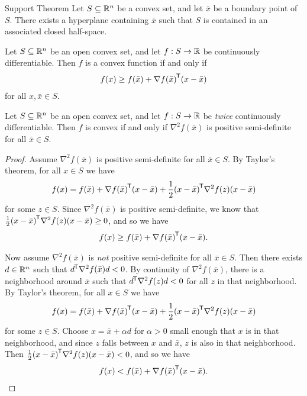 \begin{thm}{Support Theorem}\label{support-theorem}\proofbreak
    Let $S \subseteq \mathbb{R}^n$ be a convex set, and let $\bar{x}$ be a boundary point of $S$. There exists a hyperplane containing $\bar{x}$ such that $S$ is contained in an associated closed half-space.
\end{thm}

\begin{thm}\label{convex-function-tangent-hyperplane}
    Let $S \subseteq \mathbb{R}^n$ be an open convex set, and let $f: S \to \mathbb{R}$ be continuously differentiable. Then $f$ is a convex function if and only if
    \begin{align*}
        f(x) \geq f(\bar{x}) + {\nabla f(\bar{x})}^{\mkern-1.5mu\mathsf{T}}(x - \bar{x})
    \end{align*}
    for all $x, \bar{x} \in S$. 
\end{thm}

\begin{thm}
    Let $S \subseteq \mathbb{R}^n$ be an open convex set, and let $f: S \to \mathbb{R}$ be \emph{twice} continuously differentiable. Then $f$ is convex if and only if $\nabla^2f(\bar{x})$ is positive semi-definite for all $\bar{x} \in S$.
\end{thm}

\begin{proof}\proofbreak
    Assume $\nabla^2f(\bar{x})$ is positive semi-definite for all $\bar{x} \in S$. By Taylor's theorem, for all $x \in S$ we have
    \begin{align*}
        f(x) = f(\bar{x}) + {\nabla f(\bar{x})}^{\mkern-1.5mu\mathsf{T}}(x - \bar{x}) + \frac{1}{2}{(x - \bar{x})}^{\mkern-1.5mu\mathsf{T}}\nabla^2f(z)(x - \bar{x})
    \end{align*}
    for some $z \in S$. Since $\nabla^2f(\bar{x})$ is positive semi-definite, we know that $\frac{1}{2}{(x - \bar{x})}^{\mkern-1.5mu\mathsf{T}}\nabla^2f(z)(x - \bar{x}) \geq 0$, and so we have
    \begin{align*}
        f(x) \geq f(\bar{x}) + {\nabla f(\bar{x})}^{\mkern-1.5mu\mathsf{T}}(x - \bar{x}).
    \end{align*}

    Now assume $\nabla^2f(\bar{x})$ is \emph{not} positive semi-definite for all $\bar{x} \in S$. Then there exists $d \in \mathbb{R}^n$ such that ${d}^{\mkern-1.5mu\mathsf{T}}\nabla^2f(\bar{x})d < 0$. By continuity of $\nabla^2f(\bar{x})$, there is a neighborhood around $\bar{x}$ such that ${d}^{\mkern-1.5mu\mathsf{T}}\nabla^2f(z)d < 0$ for all $z$ in that neighborhood. By Taylor's theorem, for all $x \in S$ we have
    \begin{align*}
        f(x) = f(\bar{x}) + {\nabla f(\bar{x})}^{\mkern-1.5mu\mathsf{T}}(x - \bar{x}) + \frac{1}{2}{(x - \bar{x})}^{\mkern-1.5mu\mathsf{T}}\nabla^2f(z)(x - \bar{x})
    \end{align*}
    for some $z \in S$. Choose $x = \bar{x} + \alpha d$ for $\alpha > 0$ small enough that $x$ is in that neighborhood, and since $z$ falls between $x$ and $\bar{x}$, $z$ is also in that neighborhood. Then $\frac{1}{2}{(x - \bar{x})}^{\mkern-1.5mu\mathsf{T}}\nabla^2f(z)(x - \bar{x}) < 0$, and so we have
    \begin{align*}
        f(x) < f(\bar{x}) + {\nabla f(\bar{x})}^{\mkern-1.5mu\mathsf{T}}(x - \bar{x}).
    \end{align*}
\end{proof}


